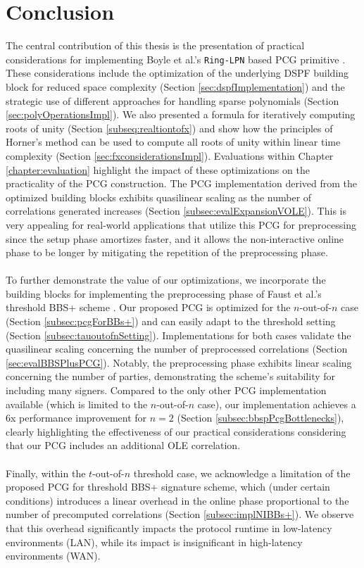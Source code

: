 \chapter{Conclusion}
The central contribution of this thesis is the presentation of practical considerations for implementing Boyle et al.'s \texttt{Ring-LPN} based PCG primitive \cite{boyle2020efficient}. These considerations include the optimization of the underlying DSPF building block for reduced space complexity (Section \ref{sec:dspfImplementation}) and the strategic use of different approaches for handling sparse polynomials (Section \ref{sec:polyOperationsImpl}). We also presented a formula for iteratively computing roots of unity (Section \ref{subseq:realtiontofx}) and show how the principles of Horner's method \cite{horner1819xxi} can be used to compute all roots of unity within linear time complexity (Section \ref{sec:fxconsiderationsImpl}). Evaluations within Chapter \ref{chapter:evaluation} highlight the impact of these optimizations on the practicality of the PCG construction. The PCG implementation derived from the optimized building blocks exhibits quasilinear scaling as the number of correlations generated increases (Section \ref{subsec:evalExpansionVOLE}). This is very appealing for real-world applications that utilize this PCG for preprocessing since the setup phase amortizes faster, and it allows the non-interactive online phase to be longer by mitigating the repetition of the preprocessing phase.
\\\\
To further demonstrate the value of our optimizations, we incorporate the building blocks for implementing the preprocessing phase of Faust et al.'s threshold BBS+ scheme \cite{faust2023non}. Our proposed PCG is optimized for the $n$-out-of-$n$ case (Section \ref{subsec:pcgForBBs+}) and can easily adapt to the threshold setting (Section \ref{subsec:tauoutofnSetting}). Implementations for both cases validate the quasilinear scaling concerning the number of preprocessed correlations (Section \ref{sec:evalBBSPlusPCG}). Notably, the preprocessing phase exhibits linear scaling concerning the number of parties, demonstrating the scheme's suitability for including many signers. Compared to the only other PCG implementation available \cite{abram2022low} (which is limited to the $n$-out-of-$n$ case), our implementation achieves a 6x performance improvement for $n=2$ (Section \ref{subsec:bbspPcgBottlenecks}), clearly highlighting the effectiveness of our practical considerations considering that our PCG includes an additional OLE correlation.
\\\\
Finally, within the $t$-out-of-$n$ threshold case, we acknowledge a limitation of the proposed PCG for threshold BBS+ signature scheme, which (under certain conditions) introduces a linear overhead in the online phase proportional to the number of precomputed correlations (Section \ref{subsec:implNIBBs+}). We observe that this overhead significantly impacts the protocol runtime in low-latency environments (LAN), while its impact is insignificant in high-latency environments (WAN).

